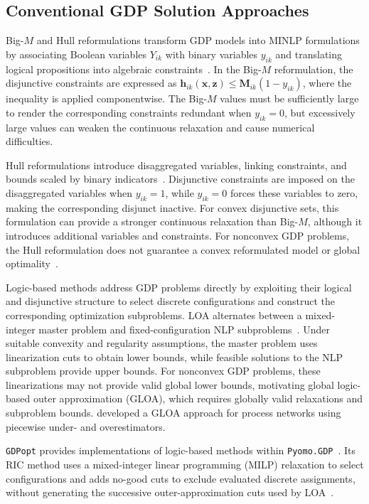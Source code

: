 \documentclass{article}
\begin{document}
\subsection{Conventional GDP Solution Approaches}

Big-\(M\) and Hull reformulations transform GDP models into MINLP formulations by associating Boolean variables \(Y_{ik}\) with binary variables \(y_{ik}\) and translating logical propositions into algebraic constraints~\citep{raman1994modelling,grossmann2003hull}.
In the Big-\(M\) reformulation, the disjunctive constraints are expressed as \(\mathbf h_{ik}(\mathbf x,\mathbf z)\leq\mathbf M_{ik}(1-y_{ik})\), where the inequality is applied componentwise.
The Big-\(M\) values must be sufficiently large to render the corresponding constraints redundant when \(y_{ik}=0\), but excessively large values can weaken the continuous relaxation and cause numerical difficulties.

Hull reformulations introduce disaggregated variables, linking constraints, and bounds scaled by binary indicators~\citep{grossmann2003hull}.
Disjunctive constraints are imposed on the disaggregated variables when \(y_{ik}=1\), while \(y_{ik}=0\) forces these variables to zero, making the corresponding disjunct inactive.
For convex disjunctive sets, this formulation can provide a stronger continuous relaxation than Big-\(M\), although it introduces additional variables and constraints.
For nonconvex GDP problems, the Hull reformulation does not guarantee a convex reformulated model or global optimality~\citep{chen2022pyomogdp}.

Logic-based methods address GDP problems directly by exploiting their logical and disjunctive structure to select discrete configurations and construct the corresponding optimization subproblems.
LOA alternates between a mixed-integer master problem and fixed-configuration NLP subproblems~\citep{turkay1996logic}.
Under suitable convexity and regularity assumptions, the master problem uses linearization cuts to obtain lower bounds, while feasible solutions to the NLP subproblem provide upper bounds.
For nonconvex GDP problems, these linearizations may not provide valid global lower bounds, motivating global logic-based outer approximation (GLOA), which requires globally valid relaxations and subproblem bounds.
\citet{bergamini2005logic} developed a GLOA approach for process networks using piecewise under- and overestimators.

\texttt{GDPopt} provides implementations of logic-based methods within \texttt{Pyomo.GDP}~\citep{chen2022pyomogdp,pyomoGDPopt}.
Its RIC method uses a mixed-integer linear programming (MILP) relaxation to select configurations and adds no-good cuts to exclude evaluated discrete assignments, without generating the successive outer-approximation cuts used by LOA~\citep{pyomoGDPopt}.
\end{document}

